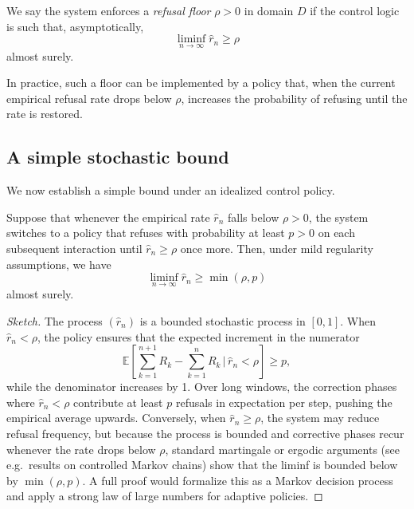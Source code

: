 \documentclass[11pt]{article}
\begin{document}
\begin{definition}
We say the system enforces a \emph{refusal floor} \(\rho > 0\) in domain \(D\) if the control logic is such that, asymptotically,
\[
\liminf_{n \to \infty} \hat{r}_n \ge \rho
\]
almost surely.
\end{definition}

In practice, such a floor can be implemented by a policy that, when the current empirical refusal rate drops below \(\rho\), increases the probability of refusing until the rate is restored.

\subsection{A simple stochastic bound}

We now establish a simple bound under an idealized control policy.

\begin{proposition}
Suppose that whenever the empirical rate \(\hat{r}_n\) falls below \(\rho > 0\), the system switches to a policy that refuses with probability at least \(p > 0\) on each subsequent interaction until \(\hat{r}_n \ge \rho\) once more. Then, under mild regularity assumptions, we have
\[
\liminf_{n \to \infty} \hat{r}_n \ge \min(\rho, p)
\]
almost surely.
\end{proposition}

\begin{proof}[Sketch]
The process \((\hat{r}_n)\) is a bounded stochastic process in \([0,1]\). When \(\hat{r}_n < \rho\), the policy ensures that the expected increment in the numerator
\[
\mathbb{E}\left[\sum_{k=1}^{n+1} R_k - \sum_{k=1}^{n} R_k \,\bigg|\, \hat{r}_n < \rho\right] \ge p,
\]
while the denominator increases by 1. Over long windows, the correction phases where \(\hat{r}_n < \rho\) contribute at least \(p\) refusals in expectation per step, pushing the empirical average upwards. Conversely, when \(\hat{r}_n \ge \rho\), the system may reduce refusal frequency, but because the process is bounded and corrective phases recur whenever the rate drops below \(\rho\), standard martingale or ergodic arguments (see e.g.\ results on controlled Markov chains) show that the liminf is bounded below by \(\min(\rho,p)\). A full proof would formalize this as a Markov decision process and apply a strong law of large numbers for adaptive policies.
\end{proof}
\end{document}
